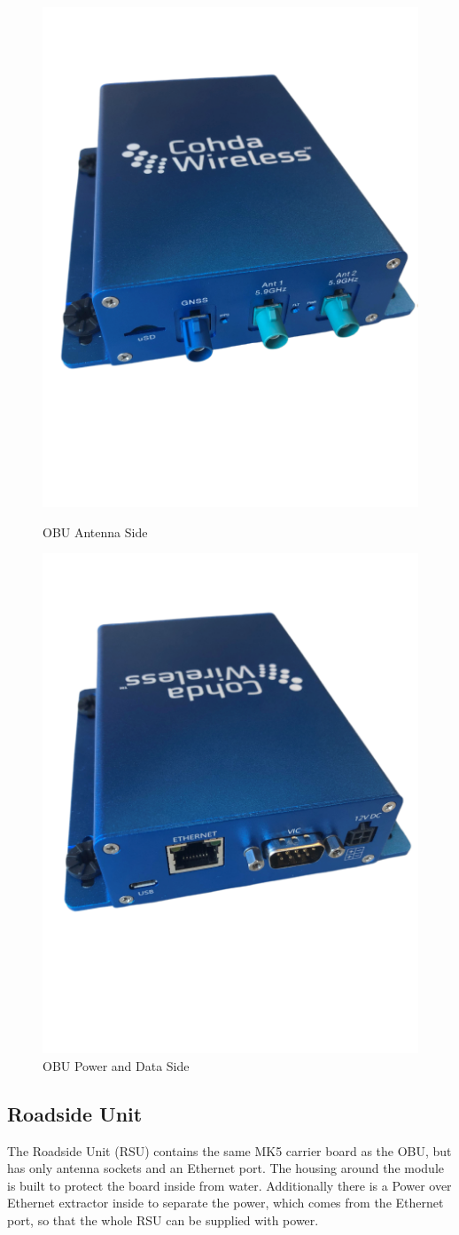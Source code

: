 \begin{figure}[htb]
	\centering
	\begin{minipage}{.5\textwidth}
		\centering
		\includegraphics[width=0.4\linewidth]{images/OBUantenna}
		\caption{OBU Antenna Side}
		\label{fig:OBUantenna}
	\end{minipage}%
	\begin{minipage}{.5\textwidth}
		\centering
		\includegraphics[width=0.4\linewidth]{images/OBUpower}
		\caption{OBU Power and Data Side}
		\label{fig:OBUpower}
	\end{minipage}
\end{figure}

\subsection{Roadside Unit}

The Roadside Unit (RSU) contains the same MK5 carrier board as the OBU, but has only antenna sockets and an Ethernet port. The housing around the module is built to protect the board inside from water. Additionally there is a Power over Ethernet extractor inside to separate the power, which comes from the Ethernet port, so that the whole RSU can be supplied with power. \cite{MK5_Datasheet} \cite{Cohda_Wireless_Hardware}


